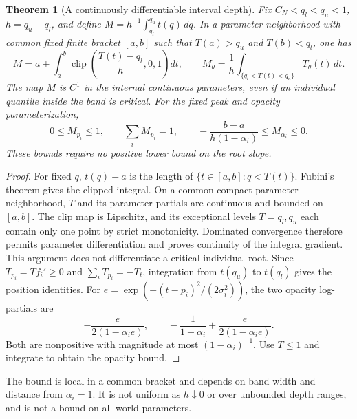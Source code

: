 \documentclass[11pt,a4paper]{article}
\newtheorem{theorem}{Theorem}
\begin{document}
\begin{theorem}[A continuously differentiable interval depth]
Fix $C_N<q_l<q_u<1$, $h=q_u-q_l$, and define
$M=h^{-1}\int_{q_l}^{q_u}t(q)\,dq$.
In a parameter neighborhood with common fixed finite bracket $[a,b]$
such that $T(a)>q_u$ and $T(b)<q_l$, one has
\[
 M=a+\int_a^b\operatorname{clip}\left(\frac{T(t)-q_l}{h},0,1\right)dt,
 \qquad
 M_\theta=\frac1h\int_{\{q_l<T(t)<q_u\}}T_\theta(t)\,dt.
\]
The map $M$ is $C^1$ in the internal continuous parameters, even if an
individual quantile inside the band is critical. For the fixed peak and
opacity parameterization,
\[
 0\le M_{p_i}\le1,\qquad \sum_i M_{p_i}=1,\qquad
 -\frac{b-a}{h(1-\alpha_i)}\le M_{\alpha_i}\le0.
\]
These bounds require no positive lower bound on the root slope.
\end{theorem}
\begin{proof}
For fixed $q$, $t(q)-a$ is the length of
$\{t\in[a,b]:q<T(t)\}$. Fubini's theorem gives the clipped integral.
On a common compact parameter neighborhood, $T$ and its parameter
partials are continuous and bounded on $[a,b]$. The clip map is
Lipschitz, and its exceptional levels $T=q_l,q_u$ each contain only one
point by strict monotonicity. Dominated convergence therefore permits
parameter differentiation and proves continuity of the integral gradient.
This argument does not differentiate a critical individual root.
Since $T_{p_i}=Tf_i'\ge0$ and $\sum_iT_{p_i}=-T_t$, integration from
$t(q_u)$ to $t(q_l)$ gives the position identities.
For $e=\exp(-(t-p_i)^2/(2\sigma_i^2))$, the two opacity log-partials are
\[
 -\frac{e}{2(1-\alpha_i e)},\qquad
 -\frac1{1-\alpha_i}+\frac{e}{2(1-\alpha_i e)}.
\]
Both are nonpositive with magnitude at most $(1-\alpha_i)^{-1}$.
Use $T\le1$ and integrate to obtain the opacity bound.
\end{proof}

The bound is local in a common bracket and depends on band width and
distance from $\alpha_i=1$. It is not uniform as $h\downarrow0$ or
over unbounded depth ranges, and is not a bound on all world parameters.
\end{document}
